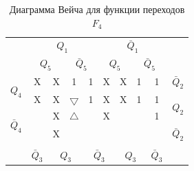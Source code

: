 \documentclass[a4paper,14pt]{article}
\begin{document}
\begin{table}[H]
	\begin{center}
		\caption{\label{tab:F4_tab} Диаграмма Вейча для функции переходов $F_4$ }
\begin{tabular}{cccccccccc}
	& \multicolumn{4}{c}{$Q_1$} & \multicolumn{4}{c}{$\bar{Q}_1$} &  \\
	& \multicolumn{2}{c}{$Q_5$} & \multicolumn{2}{c}{$\bar{Q}_5$} & \multicolumn{2}{c}{$Q_5$} & \multicolumn{2}{c}{$\bar{Q}_5$} &  \\ \cline{2-9}
	\multicolumn{1}{c|}{\multirow{2}{*}{$Q_4$}} & \multicolumn{1}{c|}{X} & \multicolumn{1}{c|}{X} & \multicolumn{1}{c|}{1} & \multicolumn{1}{c|}{1} & \multicolumn{1}{c|}{X} & \multicolumn{1}{c|}{X} & \multicolumn{1}{c|}{1} & \multicolumn{1}{c|}{1} & $\bar{Q}_2$ \\ \cline{2-9}
	\multicolumn{1}{c|}{} & \multicolumn{1}{c|}{X} & \multicolumn{1}{c|}{X} & \multicolumn{1}{c|}{$\bigtriangledown$} & \multicolumn{1}{c|}{1} & \multicolumn{1}{c|}{X} & \multicolumn{1}{c|}{X} & \multicolumn{1}{c|}{1} & \multicolumn{1}{c|}{1} & \multirow{2}{*}{$Q_2$} \\ \cline{2-9}
	\multicolumn{1}{c|}{\multirow{2}{*}{$\bar{Q}_4$}} & \multicolumn{1}{c|}{} & \multicolumn{1}{c|}{X} & \multicolumn{1}{c|}{$\bigtriangleup$} & \multicolumn{1}{c|}{} & \multicolumn{1}{c|}{X} & \multicolumn{1}{c|}{} & \multicolumn{1}{c|}{} & \multicolumn{1}{c|}{1} &  \\ \cline{2-9}
	\multicolumn{1}{c|}{} & \multicolumn{1}{c|}{} & \multicolumn{1}{c|}{X} & \multicolumn{1}{c|}{} & \multicolumn{1}{c|}{} & \multicolumn{1}{c|}{} & \multicolumn{1}{c|}{} & \multicolumn{1}{c|}{} & \multicolumn{1}{c|}{} & $\bar{Q}_2$ \\ \cline{2-9}
	&  & \multicolumn{2}{c}{} & \multicolumn{2}{c}{} & \multicolumn{2}{c}{} &  &  \\
	& $\bar{Q}_3$ & \multicolumn{2}{c}{$Q_3$} & \multicolumn{2}{c}{$\bar{Q}_3$} & \multicolumn{2}{c}{$Q_3$} & $\bar{Q}_3$ & 
\end{tabular}
	\end{center}
\end{table}

\end{document}
